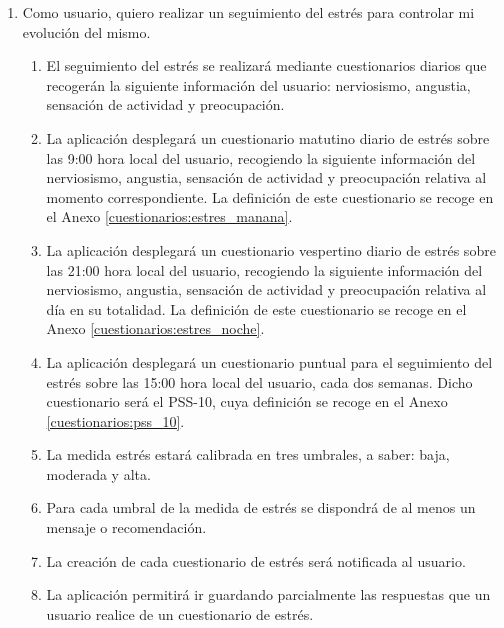         \begin{enumerate}[series=req-usuario,label=\textbf{\texttt{RU-\arabic*}}]
            \item \label{req:usuario:seguimiento_estres} Como usuario, quiero realizar un seguimiento del estrés para controlar mi evolución del mismo.
            \begin{enumerate}[series=req-funcionales,label=\textbf{\texttt{RF-\arabic*}}]
                \item \label{req:funcionales:estres_diario_info} El seguimiento del estrés se realizará mediante cuestionarios diarios que recogerán la siguiente información del usuario: nerviosismo, angustia, sensación de actividad y preocupación.
                \item \label{req:funcionales:estres_diario_manana} La aplicación desplegará un cuestionario matutino diario de estrés sobre las 9:00 hora local del usuario, recogiendo la siguiente información del nerviosismo, angustia, sensación de actividad y preocupación relativa al momento correspondiente. La definición de este cuestionario se recoge en el Anexo \ref{cuestionarios:estres_manana}.
                \item \label{req:funcionales:estres_diario_noche}  La aplicación desplegará un cuestionario vespertino diario de estrés sobre las 21:00 hora local del usuario, recogiendo la siguiente información del nerviosismo, angustia, sensación de actividad y preocupación relativa al día en su totalidad. La definición de este cuestionario se recoge en el Anexo \ref{cuestionarios:estres_noche}.
                \item \label{req:funcionales:estres_puntual} La aplicación desplegará un cuestionario puntual para el seguimiento del estrés sobre las 15:00 hora local del usuario, cada dos semanas. Dicho cuestionario será el PSS-10, cuya definición se recoge en el Anexo \ref{cuestionarios:pss_10}.
                \item \label{req:funcionales:estres_umbrales} La medida estrés estará calibrada en tres umbrales, a saber: baja, moderada y alta.
                \item \label{req:funcionales:estres_umbrales_consejo} Para cada umbral de la medida de estrés se dispondrá de al menos un mensaje o recomendación.
                \item \label{req:funcionales:estres_notificacion} La creación de cada cuestionario de estrés será notificada al usuario.
                \item \label{req:funcionales:estres_cuestionario_aplazar} La aplicación permitirá ir guardando parcialmente las respuestas que un usuario realice de un cuestionario de estrés.

\end{enumerate}
\end{enumerate}
